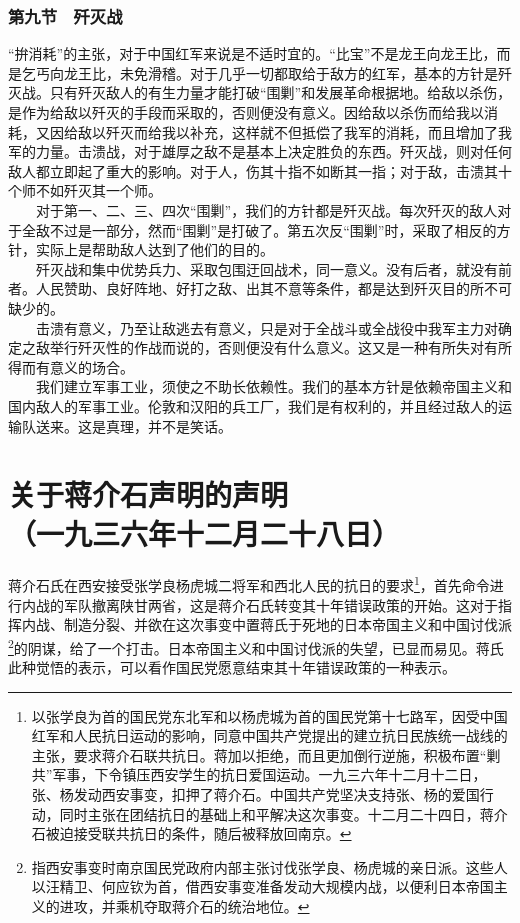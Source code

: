 \documentclass[cn,11pt,chinese]{elegantbook}
\def\myformat#1{\hfil\hfil #1}
\begin{document}
\subsubsection*{\myformat{第九节　歼灭战}}
“拚消耗”的主张，对于中国红军来说是不适时宜的。“比宝”不是龙王向龙王比，而是乞丐向龙王比，未免滑稽。对于几乎一切都取给于敌方的红军，基本的方针是歼灭战。只有歼灭敌人的有生力量才能打破“围剿”和发展革命根据地。给敌以杀伤，是作为给敌以歼灭的手段而采取的，否则便没有意义。因给敌以杀伤而给我以消耗，又因给敌以歼灭而给我以补充，这样就不但抵偿了我军的消耗，而且增加了我军的力量。击溃战，对于雄厚之敌不是基本上决定胜负的东西。歼灭战，则对任何敌人都立即起了重大的影响。对于人，伤其十指不如断其一指；对于敌，击溃其十个师不如歼灭其一个师。\\
　　对于第一、二、三、四次“围剿”，我们的方针都是歼灭战。每次歼灭的敌人对于全敌不过是一部分，然而“围剿”是打破了。第五次反“围剿”时，采取了相反的方针，实际上是帮助敌人达到了他们的目的。\\
　　歼灭战和集中优势兵力、采取包围迂回战术，同一意义。没有后者，就没有前者。人民赞助、良好阵地、好打之敌、出其不意等条件，都是达到歼灭目的所不可缺少的。\\
　　击溃有意义，乃至让敌逃去有意义，只是对于全战斗或全战役中我军主力对确定之敌举行歼灭性的作战而说的，否则便没有什么意义。这又是一种有所失对有所得而有意义的场合。\\
　　我们建立军事工业，须使之不助长依赖性。我们的基本方针是依赖帝国主义和国内敌人的军事工业。伦敦和汉阳的兵工厂，我们是有权利的，并且经过敌人的运输队送来。这是真理，并不是笑话。\\
\newpage\section*{\myformat{关于蒋介石声明的声明}\\\myformat{（一九三六年十二月二十八日）}}
蒋介石氏在西安接受张学良杨虎城二将军和西北人民的抗日的要求\footnote[1]{ 以张学良为首的国民党东北军和以杨虎城为首的国民党第十七路军，因受中国红军和人民抗日运动的影响，同意中国共产党提出的建立抗日民族统一战线的主张，要求蒋介石联共抗日。蒋加以拒绝，而且更加倒行逆施，积极布置“剿共”军事，下令镇压西安学生的抗日爱国运动。一九三六年十二月十二日，张、杨发动西安事变，扣押了蒋介石。中国共产党坚决支持张、杨的爱国行动，同时主张在团结抗日的基础上和平解决这次事变。十二月二十四日，蒋介石被迫接受联共抗日的条件，随后被释放回南京。}，首先命令进行内战的军队撤离陕甘两省，这是蒋介石氏转变其十年错误政策的开始。这对于指挥内战、制造分裂、并欲在这次事变中置蒋氏于死地的日本帝国主义和中国讨伐派\footnote[2]{ 指西安事变时南京国民党政府内部主张讨伐张学良、杨虎城的亲日派。这些人以汪精卫、何应钦为首，借西安事变准备发动大规模内战，以便利日本帝国主义的进攻，并乘机夺取蒋介石的统治地位。}的阴谋，给了一个打击。日本帝国主义和中国讨伐派的失望，已显而易见。蒋氏此种觉悟的表示，可以看作国民党愿意结束其十年错误政策的一种表示。\\
\end{document}
